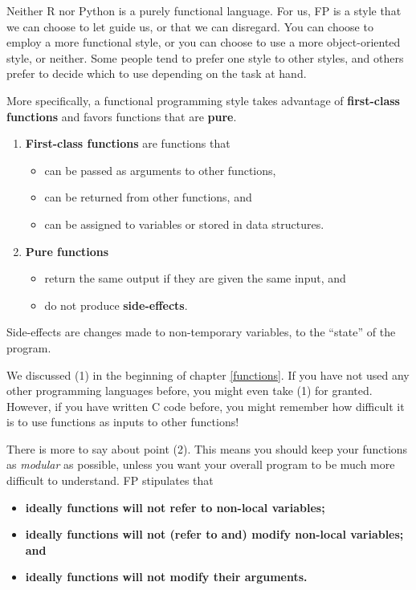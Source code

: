 \documentclass[
  12pt,
]{krantz}
\providecommand{\tightlist}{%
  \setlength{\itemsep}{0pt}\setlength{\parskip}{0pt}}
\begin{document}
Neither R nor Python is a purely functional language. For us, FP is a style that we can choose to let guide us, or that we can disregard. You can choose to employ a more functional style, or you can choose to use a more object-oriented style, or neither. Some people tend to prefer one style to other styles, and others prefer to decide which to use depending on the task at hand.

More specifically, a functional programming style takes advantage of \textbf{first-class functions} and favors functions that are \textbf{pure}.

\begin{enumerate}
\def\labelenumi{\arabic{enumi}.}
\tightlist
\item
  \textbf{First-class functions} are \citep{struc_and_interp} functions that

  \begin{itemize}
  \tightlist
  \item
    can be passed as arguments to other functions,
  \item
    can be returned from other functions, and
  \item
    can be assigned to variables or stored in data structures.
  \end{itemize}
\item
  \textbf{Pure functions}

  \begin{itemize}
  \tightlist
  \item
    return the same output if they are given the same input, and
  \item
    do not produce \textbf{side-effects}.
  \end{itemize}
\end{enumerate}

Side-effects are changes made to non-temporary variables, to the ``state'' of the program.

We discussed (1) in the beginning of chapter \ref{functions}. If you have not used any other programming languages before, you might even take (1) for granted. However, if you have written C code before, you might remember how difficult it is to use functions as inputs to other functions!

There is more to say about point (2). This means you should keep your functions as \emph{modular} as possible, unless you want your overall program to be much more difficult to understand. FP stipulates that

\begin{itemize}
\item
  \textbf{ideally functions will not refer to non-local variables;}
\item
  \textbf{ideally functions will not (refer to and) modify non-local variables; and}
\item
  \textbf{ideally functions will not modify their arguments.}
\end{itemize}
\end{document}
